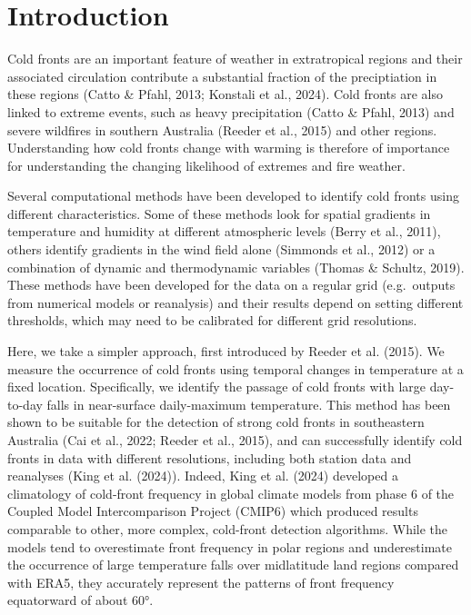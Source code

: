 \documentclass[
]{agujournal2019}
\begin{document}
\section{Introduction}\label{introduction}

Cold fronts are an important feature of weather in extratropical regions
and their associated circulation contribute a substantial fraction of
the preciptiation in these regions (Catto \& Pfahl, 2013; Konstali et
al., 2024). Cold fronts are also linked to extreme events, such as heavy
precipitation (Catto \& Pfahl, 2013) and severe wildfires in southern
Australia (Reeder et al., 2015) and other regions. Understanding how
cold fronts change with warming is therefore of importance for
understanding the changing likelihood of extremes and fire weather.

Several computational methods have been developed to identify cold
fronts using different characteristics. Some of these methods look for
spatial gradients in temperature and humidity at different atmospheric
levels (Berry et al., 2011), others identify gradients in the wind field
alone (Simmonds et al., 2012) or a combination of dynamic and
thermodynamic variables (Thomas \& Schultz, 2019). These methods have
been developed for the data on a regular grid (e.g.~outputs from
numerical models or reanalysis) and their results depend on setting
different thresholds, which may need to be calibrated for different grid
resolutions.

Here, we take a simpler approach, first introduced by Reeder et al.
(2015). We measure the occurrence of cold fronts using temporal changes
in temperature at a fixed location. Specifically, we identify the
passage of cold fronts with large day-to-day falls in near-surface
daily-maximum temperature. This method has been shown to be suitable for
the detection of strong cold fronts in southeastern Australia (Cai et
al., 2022; Reeder et al., 2015), and can successfully identify cold
fronts in data with different resolutions, including both station data
and reanalyses (King et al. (2024)). Indeed, King et al. (2024)
developed a climatology of cold-front frequency in global climate models
from phase 6 of the Coupled Model Intercomparison Project (CMIP6) which
produced results comparable to other, more complex, cold-front detection
algorithms. While the models tend to overestimate front frequency in
polar regions and underestimate the occurrence of large temperature
falls over midlatitude land regions compared with ERA5, they accurately
represent the patterns of front frequency equatorward of about 60°.
\end{document}
